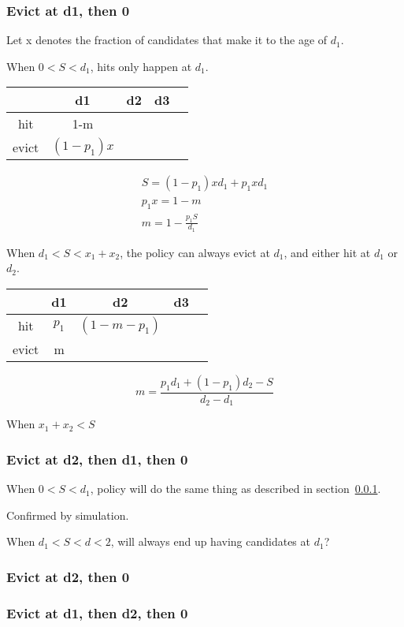 \documentclass[12pt, letterpaper]{article}
\begin{document}
\subsubsection{Evict at d1, then 0}
\label{sec:d1-0}

Let x denotes the fraction of candidates that make it to the age of $d_1$.

When $0<S<d_1$, hits only happen at $d_1$. 

\begin{center}
\begin{tabular}{ c | c c c c }
\hline
 		& d1  & d2 & d3\\ 
\hline
 hit 	& 1-m & &\\  
 evict 	& $(1-p_1)x$   & &\\
\hline
\end{tabular}
\end{center}

\begin{equation}
\begin{gathered}
S = (1-p_1)xd_1 + p_1 x d_1 \\
p_1 x = 1 - m \\
m = 1 - \frac{p_1 S}{d_1}
\end{gathered}
\end{equation}

When $d_1<S< x_1 + x_2$, the policy can always evict at $d_1$, and either hit at $d_1$
or $d_2$. 
\begin{center}
\begin{tabular}{ c | c c c c }
\hline
      & d1    & d2 & d3\\ 
\hline 
hit   & $p_1$ & $(1-m-p_1)$ &\\
evict & m   & & \\
\hline 
\end{tabular}
\end{center}

\begin{equation}
m = \frac{p_1 d_1 + (1-p_1) d_2 - S}{d_2 - d_1}
\end{equation}

When $ x_1 + x_2 < S $ 

\subsubsection{Evict at d2, then d1, then 0}

When $0<S<d_1$, policy will do the same thing as described in
section~\ref{sec:d1-0}. 

Confirmed by simulation.

When $d_1<S<d<2$, will always end up having candidates at $d_1$?

\subsubsection{Evict at d2, then 0}
\subsubsection{Evict at d1, then d2, then 0}
\end{document}

